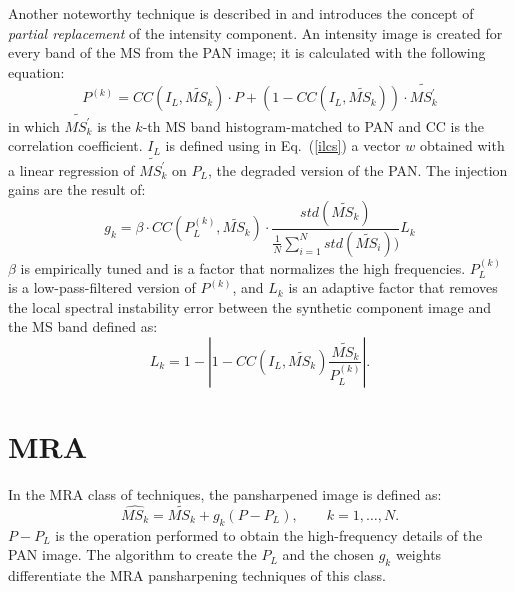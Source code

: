 \documentclass[12pt]{report}
\begin{document}
Another noteworthy technique is described in \cite{cs7} and introduces the concept of 
\textit{partial replacement} of the intensity component. An intensity
image is created  for every band of the MS from the PAN image; it is calculated with the following equation:
%
\begin{equation}
    P^{(k)} = CC(I_L, \widetilde{MS_k}) \cdot P + (1 - CC(I_L, \widetilde{MS_k})) \cdot 
    \widetilde{MS_k^{'}}
    \label{pk}
\end{equation}
%
in which $\widetilde{MS_k^{'}}$ is the $k$-th MS band histogram-matched to PAN and CC is the
correlation coefficient.
$I_L$ is defined using in Eq.~(\ref{ilcs}) a vector $w$  obtained with a linear regression of $\widetilde{MS_k^{'}}$
on $P_L$, the degraded version of the PAN.
The injection gains are the result of:
%
\begin{equation}
    g_k = \beta \cdot CC(P_L^{(k)}, \widetilde{MS_k}) \cdot 
    \frac{std(\widetilde{MS_k})}{\frac{1}{N}\sum_{i=1}^N std(\widetilde{MS_i}))} L_k
    \label{gkpk}
\end{equation}
%
$\beta$ is empirically tuned and is a factor that normalizes the high frequencies.
$P_L^{(k)}$ is a low-pass-filtered version of  $P^{(k)}$,  and $L_k$ is an adaptive factor 
that removes the local spectral instability error between the synthetic component image 
and the MS band defined as:
%
\begin{equation}
    L_k = 1 - \left|1 - CC(I_L, \widetilde{MS_k})\frac{\widetilde{MS_k}}{P_L^{(k)}}\right|.
    \label{lk}
\end{equation}
%

\section{MRA}

In the MRA class of techniques, the pansharpened image is defined as:
%
\begin{equation}
    \widehat{MS_k} = \widetilde{MS_k} + g_k(P - P_L), \qquad k = 1,\dots,N. 
    \label{mra}
\end{equation}
%
$P - P_L$  is the operation performed to obtain the high-frequency details of the PAN image. 
The algorithm to create the $P_L$ and the chosen $g_k$ weights differentiate the MRA 
pansharpening techniques of this class.
\end{document}
